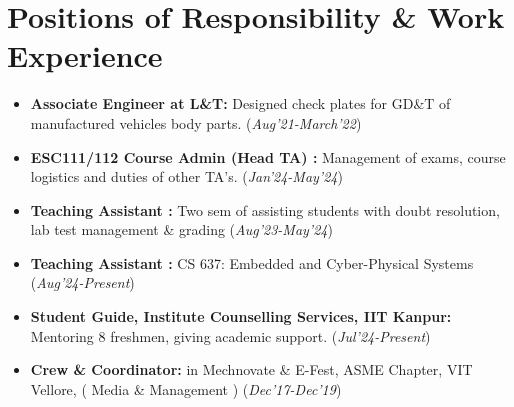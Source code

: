 \documentclass[10.8pt, a4paper]{extarticle}
\newcommand{\shorterSection}[1]{\vspace{-10pt}\section{#1}}
\begin{document}
\vspace{0mm}


\shorterSection{Positions of Responsibility \& Work Experience}
\begin{itemize}

\item \textbf{Associate Engineer at L\&T:} Designed check plates for GD\&T of manufactured 
 vehicles body parts. 
\href{https://drive.google.com/file/d/1OrfxyGyHMvoRFeCne3UPIx8iQgQaKPqk/view?usp=sharing}{\faLink{}} \href{https://drive.google.com/file/d/1JMF9GNNZ7MU2pVo0j9vEk110BOJtHZgV/view?usp=sharing}{\faLink{}}  \hfill\hfill(\textit{Aug'21-March'22})  \\[-0.6cm]

\item \textbf{ESC111/112 Course Admin (Head TA) :} Management of exams, course logistics and duties of other TA's. \hfill\hfill(\textit{Jan'24-May'24})  \\[-0.6cm]

\item \textbf{Teaching Assistant :} Two sem of assisting students with doubt resolution, lab test management \& grading \hfill\hfill(\textit{Aug'23-May'24})  \\[-0.6cm]

\item \textbf{Teaching Assistant :} CS 637: Embedded and Cyber-Physical Systems \hfill\hfill(\textit{Aug'24-Present})  \\[-0.6cm]

\item \textbf{Student Guide, Institute Counselling Services, IIT Kanpur:} Mentoring 8 freshmen, giving academic support. \hfill\hfill(\textit{Jul'24-Present})\\[-0.6cm]

\item \textbf{Crew \& Coordinator: }in Mechnovate \& E-Fest, ASME Chapter, VIT Vellore, ( Media \& Management ) 
\href{https://drive.google.com/file/d/1skeeRg3UISDUtRxwI7Nfen7c6zbsuysX/view?usp=sharing}{\faLink{}} \hfill\hfill(\textit{Dec'17-Dec'19}) 

\vspace{2mm}
\end{itemize}


\end{document}
